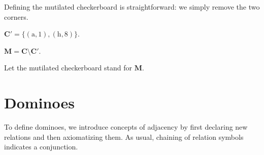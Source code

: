 \documentclass{article}
\newcommand{\fileA}{\mathrm{a}}
\newcommand{\fileH}{\mathrm{h}}
\newcommand{\Checkerboard}{\mathbf{C}}
\newcommand{\Corners}{\mathbf{C'}}
\newcommand{\Mutilated}{\mathbf{M}}
\begin{document}
Defining the mutilated checkerboard is straightforward:
we simply remove the two corners.

\begin{forthel}
    \begin{definition}
        $\Corners = \{ (\fileA, 1), (\fileH, 8) \}$.
    \end{definition}

    \begin{definition}
        $\Mutilated = \Checkerboard \setminus \Corners$.
    \end{definition}

    Let the mutilated checkerboard stand for $\Mutilated$.
\end{forthel}



\section{Dominoes}

To define dominoes,
we introduce concepts of adjacency by first declaring new relations and then axiomatizing them.
As usual, chaining of relation symbols indicates a conjunction.
\end{document}
